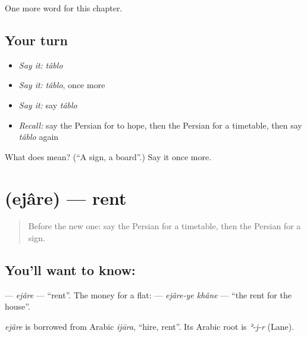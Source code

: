 \begin{grammarlens}[title={What you've built}]
One more word for this chapter.
\end{grammarlens}

\subsection*{Your turn}
\begin{itemize}
\raggedright
  \item \emph{Say it:} \emph{tâblo}
  \item \emph{Say it:} \emph{tâblo}, once more
  \item \emph{Say it:} say \emph{tâblo}
  \item \emph{Recall:} say the Persian for to hope, then the Persian for a timetable, then say \emph{tâblo} again
\end{itemize}

\begin{tcolorbox}[breakable,colback=teal!4,colframe=teal!35!black,title={Before you move on}]
What does  mean? (\textquotedblleft{}A sign, a board\textquotedblright{}.) Say it once more.
\end{tcolorbox}
\section[\texorpdfstring{\fa{اجاره} (ejâre)}{اجاره (ejâre)}]{ (ejâre) — rent}

\label{lesson:FA-C139-ejare}



\begin{quote}
Before the new one: say the Persian for a timetable, then the Persian for a sign.
\end{quote}

\subsection*{You'll want to know: }
\textbf{} — \emph{ejâre} — \textquotedblleft{}rent\textquotedblright{}. The money for a flat: \textbf{ } — \emph{ejâre-ye khâne} — \textquotedblleft{}the rent for the house\textquotedblright{}.

\begin{cousinweb}
\emph{ejâre} is borrowed from Arabic \emph{ijāra}, \textquotedblleft{}hire, rent\textquotedblright{}. Its Arabic root is \emph{ʾ-j-r} (Lane).
\end{cousinweb}

